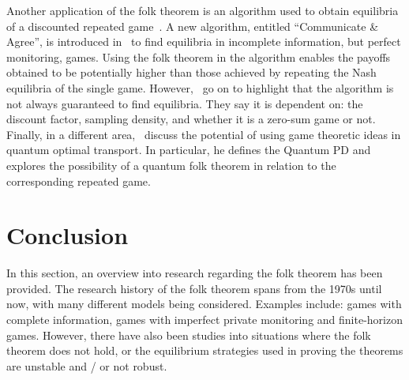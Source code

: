 Another application of the folk theorem is an algorithm used to obtain
equilibria of a discounted repeated game~\cite{Parras2020}. A new algorithm,
entitled ``Communicate \& Agree'', is introduced in~\cite{Parras2020} to
find equilibria in incomplete information, but perfect monitoring, games. Using
the folk theorem in the algorithm enables the payoffs obtained to be potentially
higher than those achieved by repeating the Nash equilibria of the single game.
However,~\cite{Parras2020} go on to highlight that the algorithm is not always
guaranteed to find equilibria. They say it is dependent on: the discount
factor, sampling density, and whether it is a zero-sum game or not.
Finally, in a different area,~\cite{Ikeda2020} discuss the potential of using
game theoretic ideas in quantum optimal transport. In particular, he defines
the Quantum PD and explores the possibility of a quantum folk
theorem in relation to the corresponding repeated game.


\section{Conclusion}\label{sec:Conclusion}
In this section, an overview into research regarding the folk theorem has been
provided. The research history of the folk theorem spans from the 1970s until
now, with many different models being considered. Examples include: games with
complete information, games with imperfect private monitoring and finite-horizon
games. However, there have also been studies into situations where the folk
theorem does not hold, or the equilibrium strategies used in proving the
theorems are unstable and / or not robust. 